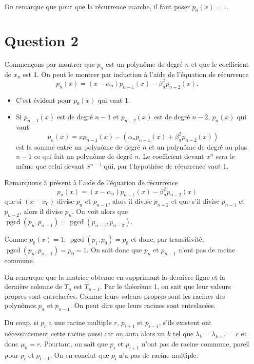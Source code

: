 \documentclass{article}
\DeclareMathOperator{\pgcd}{pgcd} %
\DeclareMathOperator{\newdiff}{d} %
\newcommand{\dif}{\newdiff\!}
\begin{document}
On remarque que pour que la récurrence marche,
il faut poser $p_0(x) = 1$.

\section*{Question 2}
Commençons par montrer que $p_n$ est un polynôme de degré $n$ et que le
coefficient de $x_n$ est 1.
On peut le montrer par induction à l'aide de l'équation de récurrence
\[ p_n(x) = (x - \alpha_n)p_{n-1}(x) - \beta_n^2p_{n-2}(x). \]
\begin{itemize}
  \item C'est évident pour $p_0(x)$ qui vaut 1.
  \item Si $p_{n-1}(x)$ est de degré $n-1$ et $p_{n-2}(x)$ est de degré
    $n-2$, $p_n(x)$ qui vaut
    \[ p_n(x) = xp_{n-1}(x) - (\alpha_np_{n-1}(x) + \beta_n^2p_{n-2}(x)) \]
    est la somme entre un polynôme de degré $n$ et un polynôme de
    degré au plus $n-1$ ce qui fait un polynôme de degré $n$.
    Le coefficient devant $x^n$ sera le même que celui devant $x^{n-1}$ qui,
    par l'hypothèse de récurrence vaut 1.
\end{itemize}

Remarquons à présent à l'aide de l'équation de récurrence
\[ p_n(x) = (x - \alpha_n)p_{n-1}(x) - \beta_n^2p_{n-2}(x) \]
que si $(x-x_0)$ divise $p_n$ et $p_{n-1}$, alors il divise
$p_{n-2}$ et que s'il divise $p_{n-1}$ et $p_{n-2}$, alors il divise $p_n$.
On voit alors que $\pgcd(p_n, p_{n-1}) = \pgcd(p_{n-1}, p_{n-2})$.

Comme $p_0(x) = 1$, $\pgcd(p_1,p_0) = p_0$ et donc, par transitivité,
$\pgcd(p_n, p_{n-1}) = p_0 = 1$.
On sait donc que $p_n$ et $p_{n-1}$ n'ont pas de racine commune.

On remarque que la matrice obtenue en supprimant
la dernière ligne et la dernière colonne de $T_n$ est $T_{n-1}$.
Par le théorème 1, on sait que leur valeurs propres sont entrelacées.
Comme leurs valeurs propres sont les racines des polynômes $p_n$ et $p_{n-1}$.
On peut dire que leurs racines sont entrelacées.

Du coup, si $p_i$ a une racine multiple $r$, $p_{i+1}$ et $p_{i-1}$,
s'ils existent ont nécessairement cette racine aussi car on aura alors
un $k$ tel que $\lambda_k = \lambda_{k+1} = r$ et donc $\mu_{k} = r$.
Pourtant, on sait que $p_i$ et $p_{i+1}$ n'ont pas de racine commune,
pareil pour $p_i$ et $p_{i-1}$.
On en conclut que $p_i$ n'a pas de racine multiple.
\end{document}
